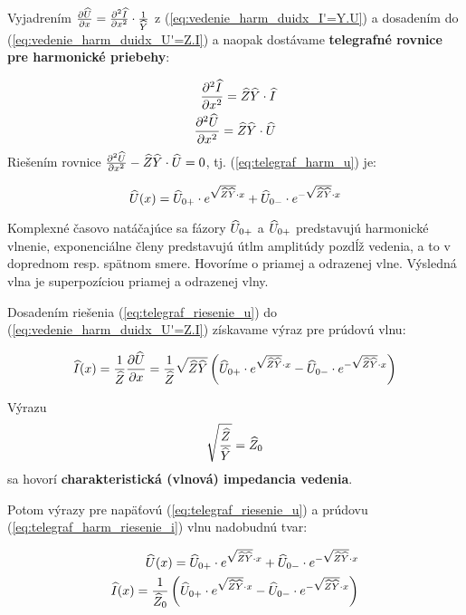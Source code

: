 Vyjadrením $\frac{\partial \widehat{U}}{\partial x} = \frac{\partial ^2\widehat{I}}{\partial x^2} \cdot \frac{1}{\widehat{Y}}$ z (\ref{eq:vedenie_harm_duidx_I'=Y.U}) a dosadením do (\ref{eq:vedenie_harm_duidx_U'=Z.I}) a naopak dostávame \textbf{telegrafné rovnice pre harmonické priebehy}:

\begin{subequations} \label{eq:telegraf_harm}
	\begin{align}
		\frac{\partial ^2\widehat{I}}{\partial x^2} = \widehat{Z}\widehat{Y} \cdot \widehat{I} \label{eq:telegraf_harm_i}\\
		\frac{\partial ^2\widehat{U}}{\partial x^2} = \widehat{Z}\widehat{Y} \cdot \widehat{U} \label{eq:telegraf_harm_u}
	\end{align}
\end{subequations}
Riešením rovnice $\frac{\partial ^2\widehat{U}}{\partial x^2} - \widehat{Z}\widehat{Y} \cdot \widehat{U} = 0$, tj. (\ref{eq:telegraf_harm_u}) je:

\begin{equation}
	\widehat{U}(x) = \widehat{U}_{0+} \cdot e^{\sqrt{\widehat{Z}\widehat{Y}} \cdot x} + \widehat{U}_{0-} \cdot e^{-\sqrt{\widehat{Z}\widehat{Y}} \cdot x}
	\label{eq:telegraf_riesenie_u}
\end{equation}

Komplexné časovo natáčajúce sa fázory $\widehat{U}_{0+}$ a  $\widehat{U}_{0+}$ predstavujú harmonické vlnenie, exponenciálne členy predstavujú útlm amplitúdy pozdĺž vedenia, a to v doprednom resp. spätnom smere. Hovoríme o priamej a odrazenej vlne. Výsledná vlna je superpozíciou priamej a odrazenej vlny.

Dosadením riešenia (\ref{eq:telegraf_riesenie_u}) do (\ref{eq:vedenie_harm_duidx_U'=Z.I}) získavame výraz pre prúdovú vlnu:

\begin{equation}
	\widehat{I}(x) = \frac{1}{\widehat{Z}} \frac{\partial \widehat{U}}{\partial x} = \frac{1}{\widehat{Z}} \sqrt{\widehat{Z}\widehat{Y}} \left( \widehat{U}_{0+} \cdot e^{\sqrt{\widehat{Z}\widehat{Y}} \cdot x} - \widehat{U}_{0-} \cdot e^{-\sqrt{\widehat{Z}\widehat{Y}} \cdot x} \right)
	\label{eq:telegraf_harm_riesenie_i}
\end{equation}

Výrazu
\begin{equation}
	\sqrt{\frac{\widehat{Z}}{\widehat{Y}}} = \widehat{Z}_0
	\label{eq:char_impedancia}
\end{equation}
sa hovorí \textbf{charakteristická (vlnová) impedancia vedenia}.

Potom výrazy pre napäťovú (\ref{eq:telegraf_riesenie_u}) a prúdovu (\ref{eq:telegraf_harm_riesenie_i}) vlnu nadobudnú tvar:

\begin{subequations} 
	\label{eq:telegraf_harm_riesenia_obe}
	\begin{align}
		\widehat{U}(x) = \widehat{U}_{0+} \cdot e^{\sqrt{\widehat{Z}\widehat{Y}} \cdot x} + \widehat{U}_{0-} \cdot e^{-\sqrt{\widehat{Z}\widehat{Y}} \cdot x}
	\label{eq:telegraf_harm_riesenia_obe_u}\\
		\widehat{I}(x) = \frac{1}{\widehat{Z}_0} \left( \widehat{U}_{0+} \cdot e^{\sqrt{\widehat{Z}\widehat{Y}} \cdot x} - \widehat{U}_{0-} \cdot e^{-\sqrt{\widehat{Z}\widehat{Y}} \cdot x} \right)
	\label{eq:telegraf_harm_riesenia_obe_i}
	\end{align}
\end{subequations}

